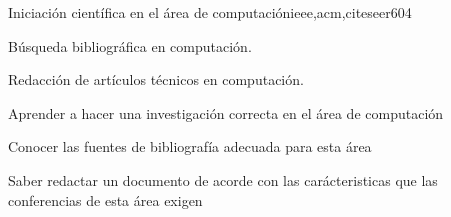 \begin{syllabus}
\begin{unit}{Iniciación científica en el área de computación}{ieee,acm,citeseer}{60}{4}
  \begin{topics}
      \item Búsqueda bibliográfica en computación.
      \item Redacción de artículos técnicos en computación.
  \end{topics}
  \begin{unitgoals}
      \item Aprender a hacer una investigación correcta en el área de computación
      \item Conocer las fuentes de bibliografía adecuada para esta área
      \item Saber redactar un documento de acorde con las carácteristicas que las conferencias de esta área exigen
  \end{unitgoals}
\end{unit}

\begin{comment}
algunos comentarios locos \abchfs
\end{comment}



\begin{coursebibliography}
\end{coursebibliography}

\end{syllabus}
